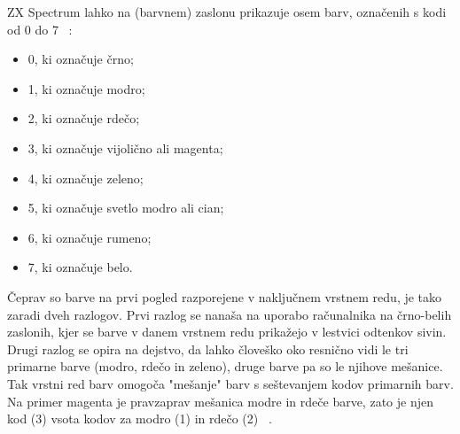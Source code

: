 \documentclass[a4paper, 12pt, openright]{book}
\begin{document}
    \begin{table}[htb]
        \begin{center}
        \end{center}
        \caption{Bitna sestava zloga atributov za položaj znaka.}
        \label{zxspectrum_attribute_addressing_tab}
    \end{table}

    ZX Spectrum lahko na (barvnem) zaslonu prikazuje osem barv, označenih s kodi
    od 0 do 7 ~\cite{zxspectrumbasicprogramming, zxspectrumintroduction}:
    \begin{itemize}
        \item 0, ki označuje črno;

        \item 1, ki označuje modro;

        \item 2, ki označuje rdečo;

        \item 3, ki označuje vijolično ali magenta;

        \item 4, ki označuje zeleno;

        \item 5, ki označuje svetlo modro ali cian;

        \item 6, ki označuje rumeno;

        \item 7, ki označuje belo.
    \end{itemize}

    Čeprav so barve na prvi pogled razporejene v naključnem vrstnem redu, je
    tako zaradi dveh razlogov. Prvi razlog se nanaša na uporabo računalnika na črno-belih
    zaslonih, kjer se barve v danem vrstnem redu prikažejo v lestvici odtenkov
    sivin. Drugi razlog se opira na dejstvo, da lahko človeško oko resnično vidi
    le tri primarne barve (modro, rdečo in zeleno), druge barve pa so le njihove
    mešanice. Tak vrstni red barv omogoča "mešanje" barv s seštevanjem kodov primarnih
    barv. Na primer magenta je pravzaprav mešanica modre in rdeče barve, zato je njen
    kod (3) vsota kodov za modro (1) in rdečo (2) ~\cite{zxspectrumbasicprogramming,
    zxspectrumintroduction}.
\end{document}
